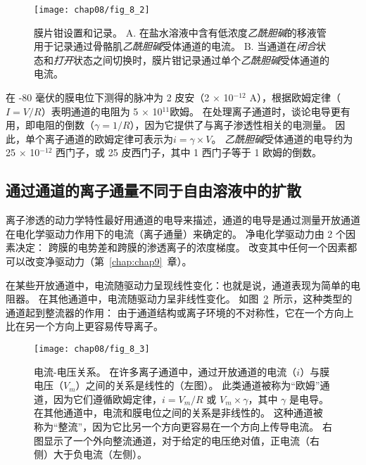 \begin{figure}[htbp]
	\centering
	\texttt{[image: chap08/fig\_8\_2]}
	\caption{膜片钳设置和记录。
	A. 在盐水溶液中含有低浓度\textit{乙酰胆碱}的移液管用于记录通过骨骼肌\textit{乙酰胆碱}受体通道的电流\cite{alberts2017molecular}。
	B. 当通道在\textit{闭合}状态和\textit{打开}状态之间切换时，膜片钳记录通过单个\textit{乙酰胆碱}受体通道的电流。}
	\label{fig:8_2}
\end{figure}



在 -80 毫伏的膜电位下测得的脉冲为 2 皮安（2 $\times$ 10$^{-12}$ A），根据欧姆定律（$I = V/R$）表明通道的电阻为 5 $\times$ 10$^{11}$欧姆。
在处理离子通道时，谈论电导更有用，即电阻的倒数（$\gamma = 1/R$），因为它提供了与离子渗透性相关的电测量。
因此，单个离子通道的欧姆定律可表示为$i=\gamma \times V$。
\textit{乙酰胆碱}受体通道的电导约为 25 $\times$ 10$^{-12}$ 西门子，或 25 皮西门子，其中 1 西门子等于 1 欧姆的倒数。



\subsection{通过通道的离子通量不同于自由溶液中的扩散}

离子渗透的动力学特性最好用通道的电导来描述，通道的电导是通过测量开放通道在电化学驱动力作用下的电流（离子通量）来确定的。
净电化学驱动力由 2 个因素决定：
跨膜的电势差和跨膜的渗透离子的浓度梯度。
改变其中任何一个因素都可以改变净驱动力（第~\ref{chap:chap9}~章）。


在某些开放通道中，电流随驱动力呈现线性变化：也就是说，通道表现为简单的电阻器。
在其他通道中，电流随驱动力呈非线性变化。
如图~\ref{fig:8_3}~所示，这种类型的通道起到整流器的作用：
由于通道结构或离子环境的不对称性，它在一个方向上比在另一个方向上更容易传导离子。


\begin{figure}[htbp]
	\centering
	\texttt{[image: chap08/fig\_8\_3]}
	\caption{电流-电压关系。
		在许多离子通道中，通过开放通道的电流（$i$）与膜电压（$V_m$）之间的关系是线性的（左图）。
		此类通道被称为“欧姆”通道，因为它们遵循欧姆定律，$i = V_m /R$ 或 $ V_m \times \gamma $，其中 $\gamma$ 是电导。
		在其他通道中，电流和膜电位之间的关系是非线性的。
		这种通道被称为“整流”，因为它比另一个方向更容易在一个方向上传导电流。
		右图显示了一个外向整流通道，对于给定的电压绝对值，正电流（右侧）大于负电流（左侧）。}
	\label{fig:8_3}
\end{figure}



